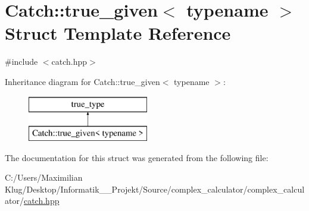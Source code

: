 \hypertarget{struct_catch_1_1true__given}{}\section{Catch\+:\+:true\+\_\+given$<$ typename $>$ Struct Template Reference}
\label{struct_catch_1_1true__given}


{\ttfamily \#include $<$catch.\+hpp$>$}

Inheritance diagram for Catch\+:\+:true\+\_\+given$<$ typename $>$\+:\begin{figure}[H]
\begin{center}
\leavevmode
\includegraphics[height=2.000000cm]{struct_catch_1_1true__given}
\end{center}
\end{figure}


The documentation for this struct was generated from the following file\+:\begin{DoxyCompactItemize}
\item 
C\+:/\+Users/\+Maximilian Klug/\+Desktop/\+Informatik\+\_\+\_\+\+Projekt/\+Source/complex\+\_\+calculator/complex\+\_\+calculator/\mbox{\hyperlink{catch_8hpp}{catch.\+hpp}}\end{DoxyCompactItemize}
